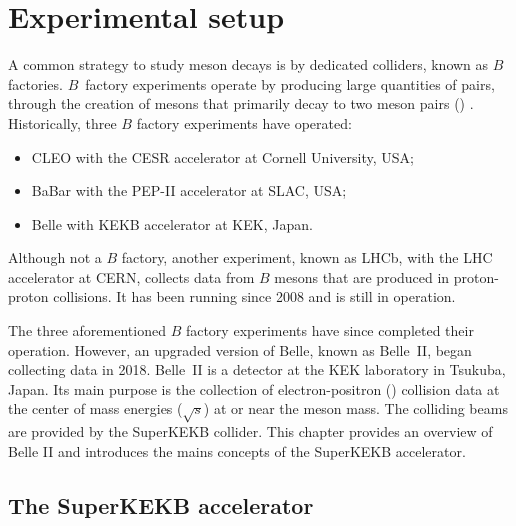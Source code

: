 \chapter{Experimental setup}\label{chap:belle2}

A common strategy to study \B meson decays is by dedicated colliders, known as $B$ factories.
$B$~factory experiments operate by producing large quantities of \BB pairs, through the creation of \FourS mesons that primarily decay to two \B meson pairs (\BB) \cite{Workman:2022ynf}.
Historically, three $B$ factory experiments have operated:
\begin{itemize}
    \item CLEO with the CESR accelerator at Cornell University, USA;
    \item BaBar with the PEP-II accelerator at SLAC, USA;
    \item Belle with KEKB accelerator at KEK, Japan.
\end{itemize}
Although not a $B$ factory, another experiment, known as LHCb, with the LHC accelerator at CERN, collects data from $B$ mesons that are produced in proton-proton collisions.
It has been running since 2008 and is still in operation.

The three aforementioned $B$ factory experiments have since completed their operation.
However, an upgraded version of Belle, known as Belle~II, began collecting data in 2018.
Belle~II is a detector at the KEK laboratory in Tsukuba, Japan.
Its main purpose is the collection of electron-positron (\epem) collision data 
at the center of mass energies ($\sqrt{s}$) at or near the \FourS meson mass.
The colliding beams are provided by the SuperKEKB \epem collider.
This chapter provides an overview of Belle II and introduces the mains concepts of the SuperKEKB accelerator.


\section{The SuperKEKB accelerator}\label{sec:superkekb}

